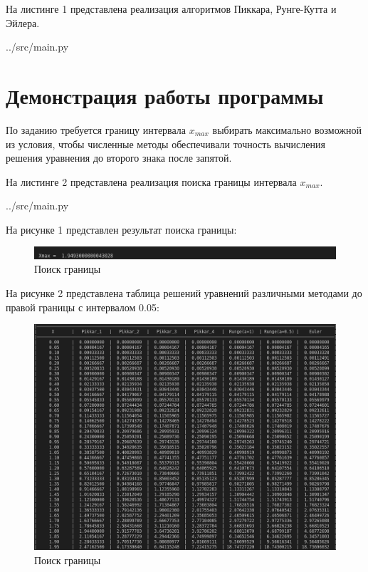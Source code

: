 На листинге 1 представлена реализация алгоритмов Пиккара, Рунге-Кутта и Эйлера.

\FloatBarrier
\begin{lstinputlisting}[language=Python, caption=Реализация алгоритмов, linerange={1-100}, 
	basicstyle=\footnotesize\ttfamily, frame=single, breaklines=true]{../src/main.py}
\end{lstinputlisting}
\FloatBarrier

\chapter*{Демонстрация работы программы}
По заданию требуется границу интервала $x_{max}$ выбирать максимально возможной из
условия, чтобы численные методы обеспечивали точность вычисления решения уравнения до второго знака после запятой.

На листинге 2 представлена реализация поиска границы интервала $x_{max}$.

\FloatBarrier
\begin{lstinputlisting}[language=Python, caption=Поиск границы интервала, linerange={116-132}, 
	basicstyle=\footnotesize\ttfamily, frame=single, breaklines=true]{../src/main.py}
\end{lstinputlisting}
\FloatBarrier

На рисунке 1 представлен результат поиска границы:

\FloatBarrier
\begin{figure}[h]
	\begin{center}
		\includegraphics[]{inc/accuracy.png}
	\end{center}
	\caption{Поиск границы}
\end{figure}
\FloatBarrier

На рисунке 2 представлена таблица решений уравнений различными методами до правой границы с интервалом 0.05:
\FloatBarrier
\begin{figure}[h]
	\begin{center}
		\includegraphics[width=\linewidth]{inc/table.png}
	\end{center}
	\caption{Поиск границы}
\end{figure}
\FloatBarrier

